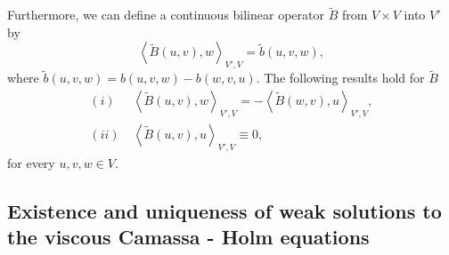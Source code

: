 \documentclass[reqno]{amsart}
\begin{document}
	Furthermore, we can define a continuous bilinear operator $ \widetilde{B}$ from $ V \times V $ into $ V'$ by \[ \left \langle \widetilde{B}(u,v),w \right \rangle _{V',V} = \widetilde{b}(u,v,w), \]
	where $ \widetilde{b}(u,v,w) = b(u,v,w) - b(w,v,u). $
	The following results hold for $ \widetilde{B}$
	\begin{align*}
		(i)\ & \left \langle \widetilde{B}(u,v),w \right \rangle_{V',V} = - \left \langle \widetilde{B}(w,v),u \right \rangle_{V',V}, \\
		(ii)\ &  \left \langle \widetilde{B}(u,v),u \right \rangle_{V',V} \equiv 0,
	\end{align*}
	for every  $ u,v,w \in V $.
	
	\subsection{Existence and uniqueness of weak solutions to the viscous Camassa - Holm equations}
	
\end{document}
